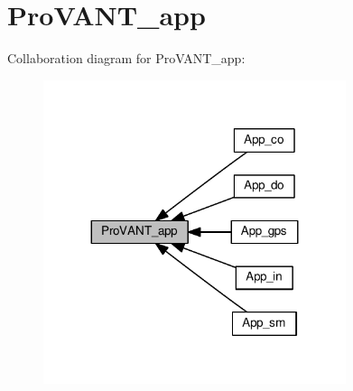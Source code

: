 \hypertarget{group__ProVANT__app}{}\section{Pro\+V\+A\+N\+T\+\_\+app}
\label{group__ProVANT__app}
Collaboration diagram for Pro\+V\+A\+N\+T\+\_\+app\+:\nopagebreak
\begin{figure}[H]
\begin{center}
\leavevmode
\includegraphics[width=251pt]{group__ProVANT__app}
\end{center}
\end{figure}
